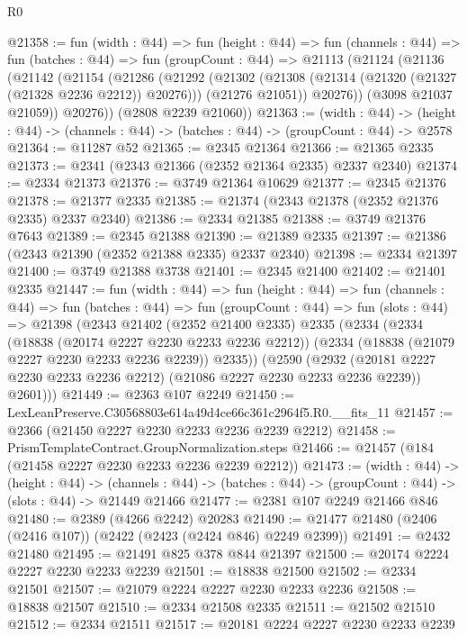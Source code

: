 \begin{lexlean}{R0}
\begin{coremodule}
@21358 := fun (width : @44) =>
  fun (height : @44) =>
  fun (channels : @44) =>
  fun (batches : @44) =>
  fun (groupCount : @44) =>
  @21113
    (@21124
      (@21136
        (@21142
          (@21154
            (@21286
              (@21292
                (@21302
                  (@21308 (@21314 (@21320 (@21327 (@21328 @2236 @2212)) @20276)))
                  (@21276 @21051))
                @20276))
            (@3098 @21037 @21059))
          @20276))
      (@2808 @2239 @21060))
@21363 := (width : @44) ->
  (height : @44) -> (channels : @44) -> (batches : @44) -> (groupCount : @44) -> @2578
@21364 := @11287 @52
@21365 := @2345 @21364
@21366 := @21365 @2335
@21373 := @2341 (@2343 @21366 (@2352 @21364 @2335) @2337 @2340)
@21374 := @2334 @21373
@21376 := @3749 @21364 @10629
@21377 := @2345 @21376
@21378 := @21377 @2335
@21385 := @21374 (@2343 @21378 (@2352 @21376 @2335) @2337 @2340)
@21386 := @2334 @21385
@21388 := @3749 @21376 @7643
@21389 := @2345 @21388
@21390 := @21389 @2335
@21397 := @21386 (@2343 @21390 (@2352 @21388 @2335) @2337 @2340)
@21398 := @2334 @21397
@21400 := @3749 @21388 @3738
@21401 := @2345 @21400
@21402 := @21401 @2335
@21447 := fun (width : @44) =>
  fun (height : @44) =>
  fun (channels : @44) =>
  fun (batches : @44) =>
  fun (groupCount : @44) =>
  fun (slots : @44) =>
  @21398
    (@2343
      @21402
      (@2352 @21400 @2335)
      @2335
      (@2334
        (@2334
          (@18838 (@20174 @2227 @2230 @2233 @2236 @2212))
          (@2334 (@18838 (@21079 @2227 @2230 @2233 @2236 @2239)) @2335))
        (@2590
          (@2932 (@20181 @2227 @2230 @2233 @2236 @2212) (@21086 @2227 @2230 @2233 @2236 @2239))
          @2601)))
@21449 := @2363 @107 @2249
@21450 := LexLeanPreserve.C30568803e614a49d4ce66c361c2964f5.R0.__fits_11
@21457 := @2366 (@21450 @2227 @2230 @2233 @2236 @2239 @2212)
@21458 := PrismTemplateContract.GroupNormalization.steps
@21466 := @21457 (@184 (@21458 @2227 @2230 @2233 @2236 @2239 @2212))
@21473 := (width : @44) ->
  (height : @44) ->
  (channels : @44) -> (batches : @44) -> (groupCount : @44) -> (slots : @44) -> @21449 @21466
@21477 := @2381 @107 @2249 @21466 @846
@21480 := @2389 (@4266 @2242) @20283
@21490 := @21477 @21480 (@2406 (@2416 @107)) (@2422 (@2423 (@2424 @846) @2249 @2399))
@21491 := @2432 @21480
@21495 := @21491 @825 @378 @844 @21397
@21500 := @20174 @2224 @2227 @2230 @2233 @2239
@21501 := @18838 @21500
@21502 := @2334 @21501
@21507 := @21079 @2224 @2227 @2230 @2233 @2236
@21508 := @18838 @21507
@21510 := @2334 @21508 @2335
@21511 := @21502 @21510
@21512 := @2334 @21511
@21517 := @20181 @2224 @2227 @2230 @2233 @2239

\end{coremodule}
\end{lexlean}

